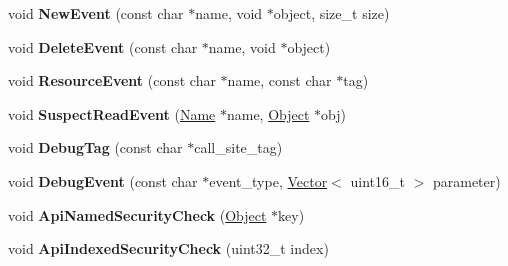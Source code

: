 \begin{DoxyCompactItemize}
\item 
\hypertarget{classv8_1_1internal_1_1_logger_a32c89d2d5ca535c3e0b9e00b73275528}{}void {\bfseries New\+Event} (const char $\ast$name, void $\ast$object, size\+\_\+t size)\label{classv8_1_1internal_1_1_logger_a32c89d2d5ca535c3e0b9e00b73275528}

\item 
\hypertarget{classv8_1_1internal_1_1_logger_a1d8c8690eb3d3d0a3e784da1d6fea25e}{}void {\bfseries Delete\+Event} (const char $\ast$name, void $\ast$object)\label{classv8_1_1internal_1_1_logger_a1d8c8690eb3d3d0a3e784da1d6fea25e}

\item 
\hypertarget{classv8_1_1internal_1_1_logger_a6c913c6d1dc334b9b34804ffa5eaf57c}{}void {\bfseries Resource\+Event} (const char $\ast$name, const char $\ast$tag)\label{classv8_1_1internal_1_1_logger_a6c913c6d1dc334b9b34804ffa5eaf57c}

\item 
\hypertarget{classv8_1_1internal_1_1_logger_a7ca5649d8233938ab1f3ddbef1daecb4}{}void {\bfseries Suspect\+Read\+Event} (\hyperlink{classv8_1_1internal_1_1_name}{Name} $\ast$name, \hyperlink{classv8_1_1internal_1_1_object}{Object} $\ast$obj)\label{classv8_1_1internal_1_1_logger_a7ca5649d8233938ab1f3ddbef1daecb4}

\item 
\hypertarget{classv8_1_1internal_1_1_logger_aeeeb8e161468f561de6e573a4f146e66}{}void {\bfseries Debug\+Tag} (const char $\ast$call\+\_\+site\+\_\+tag)\label{classv8_1_1internal_1_1_logger_aeeeb8e161468f561de6e573a4f146e66}

\item 
\hypertarget{classv8_1_1internal_1_1_logger_a10c2da30789262e9cafb452ed2262629}{}void {\bfseries Debug\+Event} (const char $\ast$event\+\_\+type, \hyperlink{classv8_1_1internal_1_1_vector}{Vector}$<$ uint16\+\_\+t $>$ parameter)\label{classv8_1_1internal_1_1_logger_a10c2da30789262e9cafb452ed2262629}

\item 
\hypertarget{classv8_1_1internal_1_1_logger_a062758e4b558d84b14aacb36f4d5b82e}{}void {\bfseries Api\+Named\+Security\+Check} (\hyperlink{classv8_1_1internal_1_1_object}{Object} $\ast$key)\label{classv8_1_1internal_1_1_logger_a062758e4b558d84b14aacb36f4d5b82e}

\item 
\hypertarget{classv8_1_1internal_1_1_logger_ad2bf3e0429312b1ee489b7819ae81ff3}{}void {\bfseries Api\+Indexed\+Security\+Check} (uint32\+\_\+t index)\label{classv8_1_1internal_1_1_logger_ad2bf3e0429312b1ee489b7819ae81ff3}


\end{DoxyCompactItemize}
